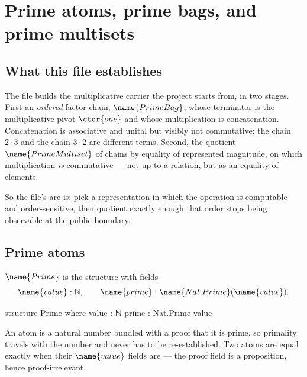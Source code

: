 
\section{Prime atoms, prime bags, and prime multisets}
\label{Prime:sec:prime}


\subsection*{What this file establishes}

The file builds the multiplicative carrier the project starts from, in two
stages.  First an \emph{ordered} factor chain, $\name{PrimeBag}$, whose
terminator is the multiplicative pivot $\ctor{one}$ and whose multiplication
is concatenation.  Concatenation is associative and unital but visibly not
commutative: the chain $2 \cdot 3$ and the chain $3 \cdot 2$ are different
terms.  Second, the quotient $\name{PrimeMultiset}$ of chains by equality of
represented magnitude, on which multiplication \emph{is} commutative --- not
up to a relation, but as an equality of elements.

So the file's arc is: pick a representation in which the operation is
computable and order-sensitive, then quotient exactly enough that order stops
being observable at the public boundary.

\subsection{Prime atoms}

\begin{definition}\label{Prime:def:prime}
$\name{Prime}$ is the structure with fields
\[
  \name{value} : \mathbb{N},
  \qquad
  \name{prime} : \name{Nat.Prime}(\name{value}).
\]
\end{definition}

\begin{leancode}
structure Prime where
  value : ℕ
  prime : Nat.Prime value
\end{leancode}

An atom is a natural number bundled with a proof that it is prime, so
primality travels with the number and never has to be re-established.  Two
atoms are equal exactly when their $\name{value}$ fields are --- the proof
field is a proposition, hence proof-irrelevant.

